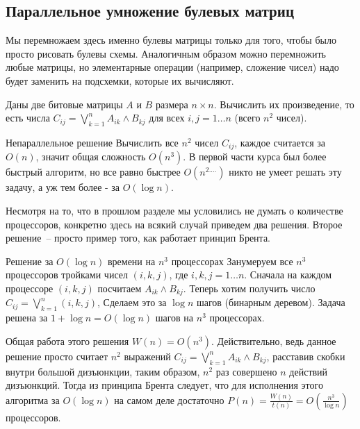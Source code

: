 \subsection{Параллельное умножение булевых матриц}
\begin{nb*} 
    Мы перемножаем здесь именно булевы матрицы только для того, чтобы было просто рисовать булевы схемы.
    Аналогичным образом можно перемножить любые матрицы, но элементарные операции (например, сложение чисел)
    надо будет заменить на подсхемки, которые их вычисляют.
\end{nb*}

\begin{problem*}
	Даны две битовые матрицы $A$ и $B$ размера $n\times n$. Вычислить их произведение, то есть числа $C_{ij} = \bigvee_{k=1}^n A_{ik}\land B_{kj}$  для всех $i, j=1\ldots n$ (всего $n^2$  чисел).
\end{problem*}

\begin{algodescription}{Непараллельное решение} 
    Вычислить все $n^2$ чисел $C_{ij}$, каждое считается за $O(n)$, значит общая сложность $O(n^3)$. 
    В первой части курса был более быстрый алгоритм, но все равно быстрее $O(n^{2.\ldots})$
    никто не умеет решать эту задачу, а уж тем более - за $O(\log n)$.
\end{algodescription}

Несмотря на то, что в прошлом разделе мы условились не думать о количестве процессоров, конкретно здесь на всякий случай приведем два решения. Второе решение~-- просто пример того, как работает принцип Брента.

\begin{algodescription}{Решение за $O(\log n)$ времени на $n^3$ процессорах}
    Занумеруем все $n^3$ процессоров тройками чисел $(i, k, j)$, где $i,k,j=1\ldots n$. Сначала на каждом процессоре $(i, k, j)$ посчитаем $A_{ik}\land B_{kj}$. Теперь хотим получить число $C_{ij} = \bigvee_{k=1}^n (i, k, j)$, Сделаем это за $\log n$ шагов (бинарным деревом). Задача решена за $1+\log n = O(\log n) $ шагов на $n^3$ процессорах. 
\end{algodescription}

Общая работа этого решения $W(n) = O(n^3)$. Действительно, ведь данное решение просто считает $n^2$ выражений $C_{ij} = \bigvee_{k=1}^n A_{ik}\land B_{kj}$, расставив скобки внутри большой дизъюнкции, таким образом, $n^2$ раз совершено $n$ действий дизъюнкций. Тогда из принципа Брента следует, что для исполнения этого алгоритма за $O(\log n)$ на самом деле достаточно $P(n) = \frac{W(n)}{t(n)} = O\left(\frac{n^3}{\log n}\right)$ процессоров. 

